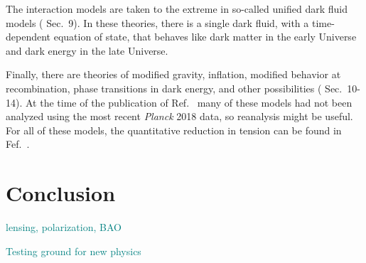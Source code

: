 \documentclass[12pt]{article}
\newcommand{\outline}[1]{\textcolor{teal}{#1}}
\newcommand{\val}[1]{\cite{DiValentino2021} Sec.~#1}
\begin{document}
The interaction models are taken to the extreme in so-called unified dark fluid models (\val{9}). In these theories, there is a single dark fluid, with a time-dependent equation of state, that behaves like dark matter in the early Universe and dark energy in the late Universe. 

Finally, there are theories of modified gravity, inflation, modified behavior at recombination, phase transitions in dark energy, and other possibilities (\val{10-14}). At the time of the publication of Ref.~\cite{DiValentino2021} many of these models had not been analyzed using the most recent \textit{Planck} 2018 data, so reanalysis might be useful. For all of these models, the quantitative reduction in tension can be found in Fef.~\cite{DiValentino2021}.

\section{Conclusion} \label{sec:concl}

\outline{lensing, polarization, BAO}

\outline{Testing ground for new physics}



\end{document}
